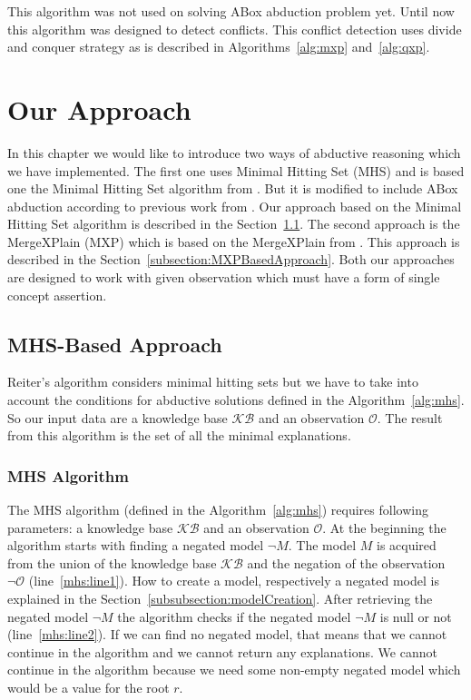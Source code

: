 \documentclass[12pt,a4paper]{article}
\begin{document}
This algorithm was not used on solving ABox abduction problem yet. Until now this algorithm was designed to detect conflicts. This conflict detection uses divide and conquer strategy as is described in Algorithms~\ref{alg:mxp} and~\ref{alg:qxp}.

\pagebreak
\section{Our Approach}
In this chapter we would like to introduce two ways of abductive reasoning which we have implemented. The first one uses Minimal Hitting Set (MHS) and is based one the Minimal Hitting Set algorithm from \cite{reiterHS}. But it is modified to include ABox abduction according to previous work from \cite{pukancovaPreliminaryReport}. Our approach based on the Minimal Hitting Set algorithm is described in the Section~\ref{subsection:MHSBasedApproach}. The second approach is the MergeXPlain (MXP) which is based on the MergeXPlain from \cite{MXP}. This approach is described in the Section~\ref{subsection:MXPBasedApproach}. Both our approaches are designed to work with given observation which must have a form of single concept assertion.

\subsection{MHS-Based Approach}
\label{subsection:MHSBasedApproach}
Reiter's algorithm considers minimal hitting sets but we have to take into account the conditions for abductive solutions defined in the Algorithm~\ref{alg:mhs}. So our input data are a knowledge base $\mathcal{KB}$ and an observation $\mathcal{O}$. The result from this algorithm is the set of all the minimal explanations.

\subsubsection{MHS Algorithm}
The MHS algorithm (defined in the Algorithm~\ref{alg:mhs}) requires following parameters: a knowledge base $\mathcal{KB}$ and an observation $\mathcal{O}$. At the beginning the algorithm starts with finding a negated model $\neg M$. The model $M$ is acquired from the union of the knowledge base $\mathcal{KB}$ and the negation of the observation $\neg \mathcal{O}$ (line~\ref{mhs:line1}). How to create a model, respectively a negated model is explained in the Section~\ref{subsubsection:modelCreation}. After retrieving the negated model $\neg M$ the algorithm checks if the negated model $\neg M$ is null or not (line~\ref{mhs:line2}). If we can find no negated model, that means that we cannot continue in the algorithm and we cannot return any explanations. We cannot continue in the algorithm because we need some non-empty negated model which would be a value for the root $r$.
\end{document}
